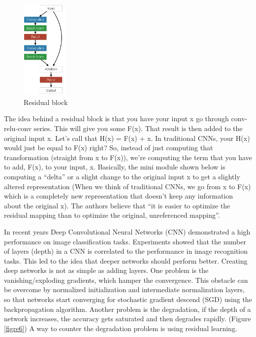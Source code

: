 \documentclass[12pt]{article}
\numberwithin{equation}{section}
\numberwithin{table}{section}
\numberwithin{figure}{section}
\begin{document}
\begin{figure}[H] \centering
	\includegraphics[width=0.2\textwidth]{res1.png}
	\caption{Residual block}
	\label{ree1}
\end{figure}

The idea behind a residual block is that you have your input x go through conv-relu-conv series. This will give you some F(x). That result is then added to the original input x. Let’s call that H(x) = F(x) + x. In traditional CNNs, your H(x) would just be equal to F(x) right? So, instead of just computing that transformation (straight from x to F(x)), we’re computing the term that you have to add, F(x), to your input, x. Basically, the mini module shown below is computing a “delta” or a slight change to the original input x to get a slightly altered representation (When we think of traditional CNNs, we go from x to F(x) which is a completely new representation that doesn’t keep any information about the original x). The authors believe that “it is easier to optimize the residual mapping than to optimize the original, unreferenced mapping”.





In recent years Deep Convolutional Neural Networks (CNN) demonstrated a high performance on image classification tasks. Experiments showed that the number of layers (depth) in a CNN is correlated to the performance in image recognition tasks.  This led to the idea that deeper networks should perform better. Creating deep networks is not as simple as adding layers. One problem is the vanishing/exploding gradients, which hamper the convergence. This obstacle can be overcome by normalized initialization and intermediate normalization layers, so that networks start converging for stochastic gradient descend (SGD) using the backpropagation algorithm. Another problem is the degradation, if the depth of a network increases, the accuracy gets saturated and then degrades rapidly. (Figure \ref{figre6}) A way to counter the degradation problem is using residual learning. 
\end{document}
